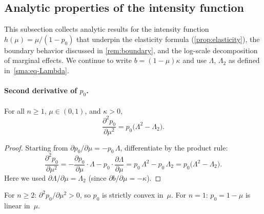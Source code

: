 
\subsection{Analytic properties of the intensity function}\label{sma:intensity}

This subsection collects analytic results for the intensity function
$h(\mu) = \mu/(1-p_0)$ that underpin the elasticity formula
(\cref{prop:elasticity}), the boundary behavior discussed in
\cref{rem:boundary}, and the log-scale decomposition of marginal effects.
We continue to write $b = (1-\mu)\kappa$ and use
$\Lambda$, $\Lambda_2$ as defined in~\eqref{sma:eq-Lambda}.


\paragraph{Second derivative of $p_0$.}

\begin{lemma}\label{sma:lem-d2p0}
  For all $n \ge 1$, $\mu \in (0,1)$, and $\kappa > 0$,
  \begin{equation}\label{sma:eq-d2p0}
    \frac{\partial^2 p_0}{\partial\mu^2}
    = p_0\bigl(\Lambda^2 - \Lambda_2\bigr).
  \end{equation}
\end{lemma}

\begin{proof}
  Starting from $\partial p_0/\partial\mu = -p_0\,\Lambda$, differentiate
  by the product rule:
  \[
    \frac{\partial^2 p_0}{\partial\mu^2}
    = -\frac{\partial p_0}{\partial\mu}\cdot\Lambda
      - p_0\cdot\frac{\partial\Lambda}{\partial\mu}
    = p_0\,\Lambda^2 - p_0\,\Lambda_2
    = p_0\bigl(\Lambda^2 - \Lambda_2\bigr).
  \]
  Here we used $\partial\Lambda/\partial\mu = \Lambda_2$ (since
  $\partial b/\partial\mu = -\kappa$).
\end{proof}

\begin{corollary}[Convexity of $p_0$ in $\mu$]\label{sma:cor-p0-convex}
  For $n \ge 2$:
  $\partial^2 p_0/\partial\mu^2 > 0$, so $p_0$ is strictly convex
  in~$\mu$. For $n = 1$: $p_0 = 1 - \mu$ is linear in~$\mu$.
\end{corollary}


